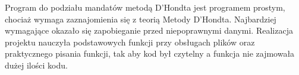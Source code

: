 \documentclass[12pt,a4paper]{article}
\begin{document}
Program do podziału mandatów metodą D'Hondta jest programem prostym, chociaż wymaga zaznajomienia się z teorią Metody D'Hondta. Najbardziej wymagające okazało się zapobieganie przed niepoprawnymi danymi. Realizacja projektu nauczyła podstawowych funkcji przy obsługach plików oraz praktycznego pisania funkcji, tak aby kod był czytelny a funkcja nie zajmowała dużej ilości kodu. 



\end{document}
